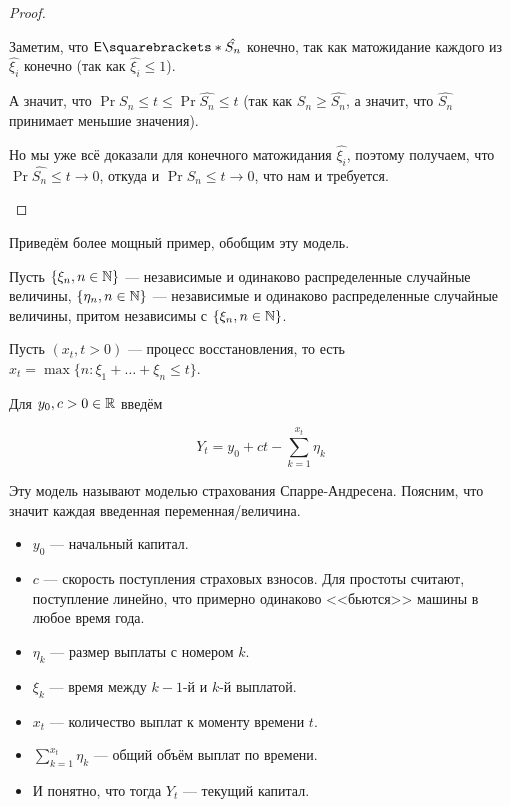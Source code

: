\begin{proof}
\begin{itemize}
    Заметим, что $\E{\hat{S_n}}$ конечно, так как матожидание каждого из
    $\hat{\xi_i}$ конечно (так как $\hat{\xi_i} \leq 1$).

    А значит, что $\Pr{S_n \leq t} \leq \Pr{\hat{S_n} \leq t}$ (так как
    $S_n \geq \hat{S_n}$, а значит, что $\hat{S_n}$ принимает меньшие значения).

    Но мы уже всё доказали для конечного матожидания $\hat{\xi_i}$, поэтому получаем,
    что $\Pr{\hat{S_n} \leq t} \to 0$, откуда и $\Pr{S_n \leq t} \to 0$, что нам и требуется.
  \end{itemize}

\end{proof}

Приведём более мощный пример, обобщим эту модель.

\begin{example}
  Пусть $\{\xi_n, n \in \mathbb{N}\}$ --- независимые и одинаково распределенные
  случайные величины, $\{\eta_n, n \in \mathbb{N}\}$ --- независимые и одинаково
  распределенные случайные величины, притом независимы с $\{\xi_n, n \in \mathbb{N}\}$.

  Пусть $(x_t, t > 0)$ --- процесс восстановления, то есть
  $x_t = \max\{n : \xi_1 + \ldots + \xi_n \leq t\}$.

  Для $y_0, c > 0 \in \mathbb{R}$ введём

  \[
    Y_t = y_0 + ct - \sum\limits_{k = 1}^{x_t} \eta_k
  \]

  Эту модель называют моделью страхования Спарре-Андресена. Поясним, что значит
  каждая введенная переменная/величина.

  \begin{itemize}
    \item $y_0$ --- начальный капитал.
    \item $c$ --- скорость поступления страховых взносов. Для простоты считают,
    поступление линейно, что примерно одинаково <<бьются>> машины в любое время
    года.
    \item $\eta_k$ --- размер выплаты с номером $k$.
    \item $\xi_k$ --- время между $k - 1$-й и $k$-й выплатой.
    \item $x_t$ --- количество выплат к моменту времени $t$.
    \item $\sum\limits_{k = 1}^{x_t} \eta_k$ --- общий объём выплат по времени.
    \item И понятно, что тогда $Y_t$ --- текущий капитал.
  \end{itemize}


\end{example}
